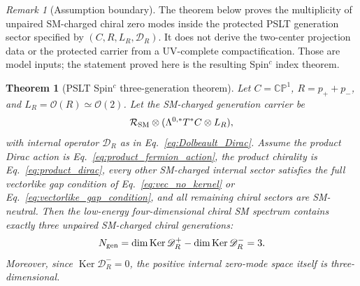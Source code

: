 \documentclass[aps,prd,preprint,notitlepage,nofootinbib,superscriptaddress,floatfix]{revtex4-2}
\newcommand{\Ker}{\operatorname{Ker}}
\newcommand{\cO}{\mathcal O}
\newcommand{\cR}{\mathcal R}
\newcommand{\CP}{\mathbb{CP}}
\newcommand{\scrD}{\mathscr D}
\newtheorem{theorem}{Theorem}
\theoremstyle{remark}
\newtheorem{remark}{Remark}
\begin{document}
\begin{remark}[Assumption boundary]
The theorem below proves the multiplicity of unpaired SM-charged chiral zero modes inside the protected PSLT generation sector specified by \((C,R,L_R,\scrD_R)\).
It does not derive the two-center projection data or the protected carrier from a UV-complete compactification.
Those are model inputs; the statement proved here is the resulting Spin\(^c\) index theorem.
\end{remark}

\begin{theorem}[PSLT Spin\(^c\) three-generation theorem]
\label{thm:three_gen}
Let \(C=\CP^1\), \(R=p_+ + p_-\), and \(L_R=\cO(R)\simeq\cO(2)\).
Let the SM-charged generation carrier be
\[
\cR_{\rm SM}\otimes(\Lambda^{0,*}T^*C\otimes L_R),
\]
with internal operator \(\scrD_R\) as in Eq.~\eqref{eq:Dolbeault_Dirac}.
Assume the product Dirac action is Eq.~\eqref{eq:product_fermion_action}, the product chirality is Eq.~\eqref{eq:product_dirac}, every other SM-charged internal sector satisfies the full vectorlike gap condition of Eq.~\eqref{eq:vec_no_kernel} or Eq.~\eqref{eq:vectorlike_gap_condition}, and all remaining chiral sectors are SM-neutral.
Then the low-energy four-dimensional chiral SM spectrum contains exactly three unpaired SM-charged chiral generations:
\begin{equation}
N_{\rm gen}
=
\dim\Ker\scrD_R^+
-\dim\Ker\scrD_R^-
=3.
\label{eq:Ngen_index}
\end{equation}
Moreover, since \(\Ker\scrD_R^-=0\), the positive internal zero-mode space itself is three-dimensional.
\end{theorem}
\end{document}
